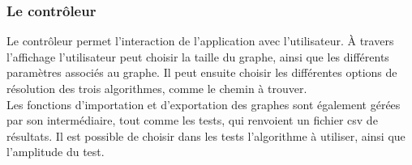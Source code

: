 \documentclass[a4paper,12pt,final] {article}
\begin{document}
\subsubsection{Le contrôleur}

Le contrôleur permet l'interaction de l'application avec l'utilisateur. À travers l'affichage l'utilisateur peut choisir la taille du graphe, ainsi que les différents paramètres associés au graphe. Il peut ensuite choisir les différentes options de résolution des trois algorithmes, comme le chemin à trouver.\\

Les fonctions d'importation et d'exportation des graphes sont également gérées par son intermédiaire, tout comme les tests, qui renvoient un fichier csv de résultats. Il est possible de choisir dans les tests l'algorithme à utiliser, ainsi que l'amplitude du test. \\
\end{document}
